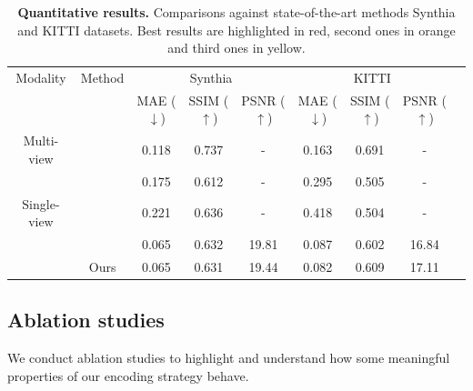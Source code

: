 \begin{table}[h!]
    \caption{\textbf{Quantitative results.} Comparisons against state-of-the-art methods Synthia \citep{ros2016synthia} and KITTI \citep{geiger2012we} datasets. Best results are highlighted in \colorbox{red!25}{red}, second ones in \colorbox{orange!25}{orange} and third ones in \colorbox{yellow!25}{yellow}. }
    \label{tab:2}
    \begin{center}%
    \begin{adjustbox}{width = \linewidth}
    \begin{tabular}[h]{c||cccccccc}
    \hline
     Modality & Method & \multicolumn{3}{c}{Synthia} & \multicolumn{3}{c}{KITTI} \\
     & &  MAE ($\downarrow$) & SSIM ($\uparrow$) & PSNR ($\uparrow$) & MAE ($\downarrow$) & SSIM ($\uparrow$) & PSNR ($\uparrow$)\\
    \hline
    Multi-view & \citep{sun2018multiview}& 0.118 & 0.737 & - & 0.163 & 0.691 & - \\
    \hline
     & \citep{tatarchenko2015single} & \cellcolor{orange!25}0.175 & 0.612 & - & \cellcolor{yellow!25}0.295 & \cellcolor{yellow!25}0.505 & -\\
     Single-view &  \citep{zhou2016view} & \cellcolor{yellow!25}0.221 & \cellcolor{red!25}0.636 & - & 0.418 & 0.504 & - \\
     &  \citep{kim2020novel} & \cellcolor{red!25}0.065 & \cellcolor{orange!25}0.632 &  \cellcolor{red!25}19.81 & \cellcolor{orange!25}0.087 & \cellcolor{orange!25}0.602 & \cellcolor{orange!25}16.84 \\
     & Ours & \cellcolor{red!25}0.065 & \cellcolor{yellow!25}0.631 & \cellcolor{orange!25}19.44 & \cellcolor{red!25}0.082 & \cellcolor{red!25}0.609 & \cellcolor{red!25}17.11 \\
    \hline 
    \end{tabular}
    \end{adjustbox}
    \end{center}
    \end{table}



\subsection{Ablation studies}
\label{sec:ablation}
We conduct ablation studies to highlight and understand how some meaningful properties of our encoding strategy behave. \newline


